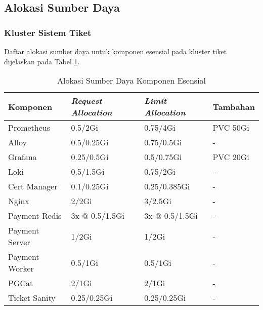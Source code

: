 \subsection{Alokasi Sumber Daya}

\subsubsection{Kluster Sistem Tiket}

Daftar alokasi sumber daya untuk komponen esensial pada kluster tiket dijelaskan pada Tabel \ref{tab:resource_allocation}.

\begin{table}[htpb]
    \centering
    \caption{Alokasi Sumber Daya Komponen Esensial}
    \label{tab:resource_allocation}
    \begin{tabular}{|l|l|l|l|}
        \hline
        \textbf{Komponen} & \textbf{\textit{Request Allocation}} & \textbf{\textit{Limit Allocation}} & \textbf{Tambahan} \\ \hline
        Prometheus        & 0.5/2Gi                              & 0.75/4Gi                           & PVC 50Gi          \\ \hline
        Alloy             & 0.5/0.25Gi                           & 0.75/0.5Gi                         & -                 \\ \hline
        Grafana           & 0.25/0.5Gi                           & 0.5/0.75Gi                         & PVC 20Gi          \\ \hline
        Loki              & 0.5/1.5Gi                            & 0.75/2Gi                           & -                 \\ \hline
        Cert Manager      & 0.1/0.25Gi                           & 0.25/0.385Gi                       & -                 \\ \hline
        Nginx             & 2/2Gi                                & 3/2.5Gi                            & -                 \\ \hline
        Payment Redis     & 3x @ 0.5/1.5Gi                       & 3x @ 0.5/1.5Gi                     & -                 \\ \hline
        Payment Server    & 1/2Gi                                & 1/2Gi                              & -                 \\ \hline
        Payment Worker    & 0.5/1Gi                              & 0.5/1Gi                            & -                 \\ \hline
        PGCat             & 2/1Gi                                & 2/1Gi                              & -                 \\ \hline
        Ticket Sanity     & 0.25/0.25Gi                          & 0.25/0.25Gi                        & -                 \\ \hline
    \end{tabular}
\end{table}

